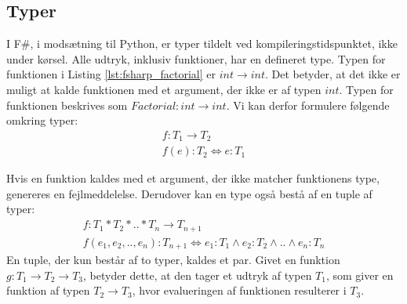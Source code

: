  
\subsection{Typer}
I F\#, i modsætning til Python, er typer tildelt ved kompileringstidspunktet, ikke under kørsel. Alle udtryk, inklusiv funktioner, har en defineret type. Typen for funktionen i Listing \textcolor{red}{\ref{lst:fsharp_factorial}} er $int \rightarrow int$. Det betyder, at det ikke er muligt at kalde funktionen med et argument, der ikke er af typen $int$. Typen for funktionen beskrives som $Factorial: int \rightarrow int$. Vi kan derfor formulere følgende omkring typer:
\begin{gather*}
    f: T_1 \rightarrow T_2 \\
    f(e) : T_2 \iff e : T_1
\end{gather*}

Hvis en funktion kaldes med et argument, der ikke matcher funktionens type, genereres en fejlmeddelelse. Derudover kan en type også bestå af en tuple af typer:
\begin{gather*}
    f: T_1 * T_2 * .. * T_n \rightarrow T_{n+1}\\
    f (e_1, e_2, .., e_n) :T_{n+1} \iff e_1 : T_1 \land e_2 : T_2 \land .. \land e_n : T_n
\end{gather*}
En tuple, der kun består af to typer, kaldes et par. Givet en funktion $g: T_1 \rightarrow T_2 \rightarrow T_3$, betyder dette, at den tager et udtryk af typen $T_1$, som giver en funktion af typen $T_2 \rightarrow T_3$, hvor evalueringen af funktionen resulterer i $T_3$.




